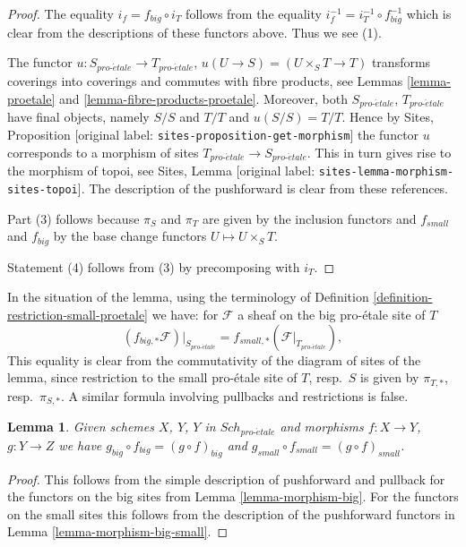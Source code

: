 \documentclass[10pt,a4paper]{article}
\theoremstyle{plain}
\newtheorem{lemma}[subsection]{Lemma}
\theoremstyle{definition}
\theoremstyle{remark}
\numberwithin{equation}{subsection}
\def\Sch{\mathit{Sch}}
\def\proetale{{pro\text{-}\acute{e}tale}}
\begin{document}
\begin{proof}
The equality $i_f = f_{big} \circ i_T$ follows from the
equality $i_f^{-1} = i_T^{-1} \circ f_{big}^{-1}$ which is
clear from the descriptions of these functors above.
Thus we see (1).

\medskip\noindent
The functor $u : S_\proetale \to T_\proetale$,
$u(U \to S) = (U \times_S T \to T)$
transforms coverings into coverings and commutes with fibre products,
see Lemmas \ref{lemma-proetale} and \ref{lemma-fibre-products-proetale}.
Moreover, both $S_\proetale$, $T_\proetale$ have final objects,
namely $S/S$ and $T/T$ and $u(S/S) = T/T$. Hence by
Sites, Proposition \textnormal{[original label: \nolinkurl{sites-proposition-get-morphism}]}
the functor $u$ corresponds to a morphism of sites
$T_\proetale \to S_\proetale$. This in turn gives rise to the
morphism of topoi, see
Sites, Lemma \textnormal{[original label: \nolinkurl{sites-lemma-morphism-sites-topoi}]}. The description
of the pushforward is clear from these references.

\medskip\noindent
Part (3) follows because $\pi_S$ and $\pi_T$ are given by the
inclusion functors and $f_{small}$ and $f_{big}$ by the
base change functors $U \mapsto U \times_S T$.

\medskip\noindent
Statement (4) follows from (3) by precomposing with $i_T$.
\end{proof}

\noindent
In the situation of the lemma, using the terminology of
Definition \ref{definition-restriction-small-proetale}
we have: for $\mathcal{F}$ a sheaf on the big pro-\'etale site of $T$
\begin{equation}
\label{equation-compare-big-small}
(f_{big, *}\mathcal{F})|_{S_\proetale} =
f_{small, *}(\mathcal{F}|_{T_\proetale}),
\end{equation}
This equality is clear from the commutativity of the diagram of
sites of the lemma, since restriction to the small pro-\'etale site of
$T$, resp.\ $S$ is given by $\pi_{T, *}$, resp.\ $\pi_{S, *}$. A similar
formula involving pullbacks and restrictions is false.

\begin{lemma}
\label{lemma-composition-proetale}
Given schemes $X$, $Y$, $Y$ in $\Sch_\proetale$
and morphisms $f : X \to Y$, $g : Y \to Z$ we have
$g_{big} \circ f_{big} = (g \circ f)_{big}$ and
$g_{small} \circ f_{small} = (g \circ f)_{small}$.
\end{lemma}

\begin{proof}
This follows from the simple description of pushforward
and pullback for the functors on the big sites from
Lemma \ref{lemma-morphism-big}. For the functors
on the small sites this follows from the description of
the pushforward functors in Lemma \ref{lemma-morphism-big-small}.
\end{proof}
\end{document}
